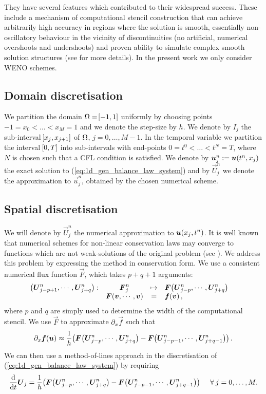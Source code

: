 \documentclass{amsart}
\theoremstyle{definition}
\theoremstyle{remark}
\numberwithin{equation}{section}
\begin{document}
They have several features which contributed to their widespread success.  These include a mechanism of computational stencil construction that can achieve arbitrarily high accuracy in regions where the solution is smooth, essentially non-oscillatory behaviour in the vicinity of discontinuities (no artificial, numerical overshoots and undershoots) and proven ability to simulate complex smooth solution structures (see \cite{shu1998essentially} for more details).  In the present work we only consider WENO schemes.

\subsection{Domain discretisation}
We partition the domain $\Omega=\!\left[{-1,1}\right]$ uniformly by choosing points $-1=x_0<\dots<x_M=1$ and we denote the step-size by $h$.  We denote by $I_j$ the sub-interval $\!\left[{x_j,x_{j+1}}\right]$ of $\Omega$, $j=0,\dots,M-1$.  In the temporal variable we partition the interval $\!\left[{0,T}\right]$ into sub-intervals with end-points $0=t^0<\dots<t^N=T$, where $N$ is chosen such that a CFL condition is satisfied. We denote by $\boldsymbol{u}^n_j:=\boldsymbol{u}\!\left({t^n,x_j}\right)$ the exact solution to (\ref{eq:1d_gen_balance_law_system}) and by $\vec U^n_j$ we denote the approximation to $\vec u^n_j$, obtained by the chosen numerical scheme.



\subsection{Spatial discretisation}
We will denote by $\vec{U}^n_j$ the numerical approximation to $\boldsymbol{u}\!\left({x_j, t^n}\right)$.  
It is well known that numerical schemes for
non-linear conservation laws may converge to functions which are not weak-solutions of the original problem (see \cite[\S12.1]{leveque1992numerical}). We address this problem by expressing the method in conservation form. We use a consistent numerical flux
function $\vec{F}$, which takes $p+q+1$ arguments:
\begin{equation}\label{eq_defn_num_flux}
 \begin{array}{rccl} {\ensuremath{\!\left({\boldsymbol{U}^n_{j-p+1},\cdots,\boldsymbol{U}^n_{j+q}}\right)}}: & {\boldsymbol{F}^n_j} &\mapsto&{{\boldsymbol{F}}\!\left({\boldsymbol{U}^n_{j-p},\cdots,\boldsymbol{U}^n_{j+q}}\right)} \\ & {\boldsymbol{F}\!\left({\boldsymbol{v},\cdots,\boldsymbol{v}}\right)} &=&{\boldsymbol{f}\!\left({\boldsymbol{v}}\right), } \end{array}\quad
\end{equation}
where $p$ and $q$ are simply used to determine the width of the
computational stencil.  We use $\vec{F}$ to approximate
$\partial_{x}\vec{f}$ such that
\begin{equation}\label{eq_num_approx_f}
\partial_{x}\boldsymbol{f}\!\left({\boldsymbol{u}}\right)\approx \frac{1}{h}\!\left({{\boldsymbol{F}\!\left({\boldsymbol{U}^n_{j-p},\cdots,\boldsymbol{U}^n_{j+q}}\right)}-{\boldsymbol{F}\!\left({\boldsymbol{U}^n_{j-p-1},\cdots,\boldsymbol{U}^n_{j+q-1}}\right)}}\right).
\end{equation}
We can then use a method-of-lines approach in the discretisation of
(\ref{eq:1d_gen_balance_law_system}) by requiring
\begin{equation}\label{eq:method_of_lines_balance}
\frac{\mathrm{d}}{\mathrm{d}t}\boldsymbol{U}_j =  \frac{1}{h}\!\left({{\boldsymbol{F}\!\left({\boldsymbol{U}^n_{j-p},\cdots,\boldsymbol{U}^n_{j+q}}\right)}-{\boldsymbol{F}\!\left({\boldsymbol{U}^n_{j-p-1},\cdots,\boldsymbol{U}^n_{j+q-1}}\right)}}\right) \quad\:\forall\: j=0, \dots, M.
\end{equation}
\end{document}
